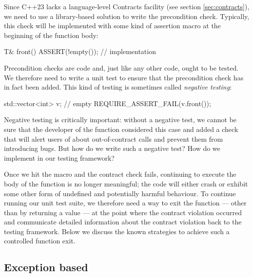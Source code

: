 Since C++23 lacks a language-level Contracts facility (see section \ref{sec:contracts}), we need to use a library-based solution to write the precondition check. Typically, this check will be implemented with some kind of assertion macro at the beginning of the function body:
\begin{codeblock}
T& front() {
  ASSERT(!empty());
  // implementation
}
\end{codeblock}


Precondition checks are code and, just like any other code, ought to be tested. We therefore need to write a unit test to ensure that the precondition check has in fact been added. This kind of testing is sometimes called \emph{negative testing}:

\begin{codeblock}
std::vector<int> v;  // empty
REQUIRE_ASSERT_FAIL(v.front());
\end{codeblock}
Negative testing is critically important: without a negative test, we cannot be sure that the developer of the  function considered this case and added a check that will alert users of  about out-of-contract calls and prevent them from introducing bugs.
But how do we write such a negative test? How do we implement  in our testing framework?

Once we hit the  macro and the contract check fails, continuing to execute the body of the function is no longer meaningful; the code will either crash or exhibit some other form of undefined and potentially harmful behaviour. To continue running our unit test suite, we therefore need a way to exit the function --- other than by returning a value --- at the point where the contract violation occurred and communicate detailed information about the contract violation back to the testing framework. Below we discuss the known strategies to achieve such a controlled function exit.

\subsection{Exception based}

